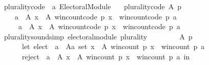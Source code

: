 \begin{isabellebody}
\ plurality{\isacharunderscore}{\kern0pt}code\ {\isacharcolon}{\kern0pt}{\isacharcolon}{\kern0pt}\ {\isachardoublequoteopen}{\isacharprime}{\kern0pt}a\ Electoral{\isacharunderscore}{\kern0pt}Module{\isachardoublequoteclose}\ \isanewline
\ \ {\isachardoublequoteopen}plurality{\isacharunderscore}{\kern0pt}code\ A\ p\ {\isacharequal}{\kern0pt}\isanewline
\ \ \ \ {\isacharparenleft}{\kern0pt}{\isacharbraceleft}{\kern0pt}a\ {\isasymin}\ A{\isachardot}{\kern0pt}\ {\isasymforall}x\ {\isasymin}\ A{\isachardot}{\kern0pt}\ win{\isacharunderscore}{\kern0pt}count{\isacharunderscore}{\kern0pt}code\ p\ x\ {\isasymle}\ win{\isacharunderscore}{\kern0pt}count{\isacharunderscore}{\kern0pt}code\ p\ a{\isacharbraceright}{\kern0pt}{\isacharcomma}{\kern0pt}\isanewline
\ \ \ \ \ {\isacharbraceleft}{\kern0pt}a\ {\isasymin}\ A{\isachardot}{\kern0pt}\ {\isasymexists}x\ {\isasymin}\ A{\isachardot}{\kern0pt}\ win{\isacharunderscore}{\kern0pt}count{\isacharunderscore}{\kern0pt}code\ p\ x\ {\isachargreater}{\kern0pt}\ win{\isacharunderscore}{\kern0pt}count{\isacharunderscore}{\kern0pt}code\ p\ a{\isacharbraceright}{\kern0pt}{\isacharcomma}{\kern0pt}\isanewline
\ \ \ \ \ {\isacharbraceleft}{\kern0pt}{\isacharbraceright}{\kern0pt}{\isacharparenright}{\kern0pt}{\isachardoublequoteclose}%
\isadelimdocument
%
\endisadelimdocument
%
\isatagdocument
%
\isamarkuptrue%
%
\endisatagdocument
{\isafolddocument}%
%
\isadelimdocument
%
\endisadelimdocument
{}\isamarkupfalse%
\ plurality{\isacharunderscore}{\kern0pt}sound{\isacharbrackleft}{\kern0pt}simp{\isacharbrackright}{\kern0pt}{\isacharcolon}{\kern0pt}\ {\isachardoublequoteopen}electoral{\isacharunderscore}{\kern0pt}module\ plurality{\isachardoublequoteclose}\isanewline
%
\isadelimproof
%
\endisadelimproof
%
\isatagproof
{}\isamarkupfalse%
\ {\isacharminus}{\kern0pt}\isanewline
\ \ \isamarkupfalse%
\isanewline
\ \ \ \ {\isachardoublequoteopen}{\isasymforall}A\ p{\isachardot}{\kern0pt}\isanewline
\ \ \ \ \ \ let\ elect\ {\isacharequal}{\kern0pt}\ {\isacharbraceleft}{\kern0pt}a\ {\isasymin}\ {\isacharparenleft}{\kern0pt}A{\isacharcolon}{\kern0pt}{\isacharcolon}{\kern0pt}{\isacharprime}{\kern0pt}a\ set{\isacharparenright}{\kern0pt}{\isachardot}{\kern0pt}\ {\isasymforall}x\ {\isasymin}\ A{\isachardot}{\kern0pt}\ win{\isacharunderscore}{\kern0pt}count\ p\ x\ {\isasymle}\ win{\isacharunderscore}{\kern0pt}count\ p\ a{\isacharbraceright}{\kern0pt}{\isacharsemicolon}{\kern0pt}\isanewline
\ \ \ \ \ \ reject\ {\isacharequal}{\kern0pt}\ {\isacharbraceleft}{\kern0pt}a\ {\isasymin}\ A{\isachardot}{\kern0pt}\ {\isasymexists}x\ {\isasymin}\ A{\isachardot}{\kern0pt}\ win{\isacharunderscore}{\kern0pt}count\ p\ x\ {\isachargreater}{\kern0pt}\ win{\isacharunderscore}{\kern0pt}count\ p\ a{\isacharbraceright}{\kern0pt}\ in\isanewline

\end{isabellebody}
